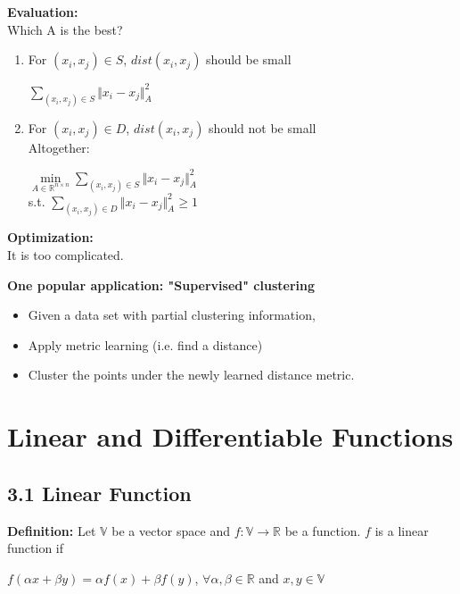 \documentclass{article}
\begin{document}
\pagebreak
\textbf{Evaluation:}\\
Which A is  the best?
\begin{enumerate}
    \item For $(x_i,x_j) \in S$, $dist(x_i,x_j)$ should be small
    \begin{center}
        $\underset{(x_i,x_j) \in S}{\sum} \Vert x_i - x_j \Vert_A^2$
    \end{center}
    \item For $(x_i,x_j) \in D$, $dist(x_i,x_j)$ should not be small \\
    Altogether: \\
    \begin{center}
        $\underset{A \in \mathbb{R}^{n \times n}}{\min} \underset{(x_i,x_j) \in S}{\sum} \Vert x_i - x_j \Vert_A^2$ \\
        s.t. $\underset{(x_i,x_j) \in D}{\sum} \Vert x_i - x_j \Vert_A^2 \geq 1$
    \end{center}
\end{enumerate}

\textbf{Optimization:} \\
It is too complicated.
\bigbreak

\textbf{One popular application: "Supervised" clustering}\\
    \begin{itemize}
        \item   Given a data set with partial clustering information,
        \begin{center}
        \end{center}
        \item Apply metric learning (i.e. find a distance)
        \item Cluster the points under the newly learned distance metric.
    \end{itemize}
\pagebreak
\section*{Linear and Differentiable Functions}
\subsection*{3.1 Linear Function}
\textbf{Definition:} Let $\mathbb{V}$ be a vector space and $f: \mathbb{V} \to \mathbb{R}$ be a function. $f$ is a linear function if 
\begin{center}
    $f(\alpha x + \beta y) = \alpha f(x) + \beta f(y)$, $\forall \alpha,\beta \in \mathbb{R}$ and $x,y \in \mathbb{V}$
\end{center}
\end{document}
